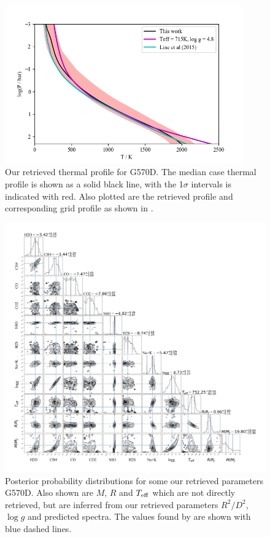 \documentclass[useAMS,usenatbib]{mn2e}
\begin{document}
\begin{figure}
\hspace{-0.8cm}\includegraphics[width=290pt]{G570D_profile_1sigma_GRID_NC.png}
\caption{Our retrieved thermal profile for G570D. The median case thermal profile is shown as a solid black line, with the 1$\sigma$ intervals is indicated with red.  Also plotted are the retrieved profile and corresponding grid profile as shown in \citet{line2015}.
\label{fig:g570TP}}
\end{figure}


\begin{figure}
\hspace{-0.8cm}
\includegraphics[width=550pt]{G570D_NC_post_corner.png}
\caption{Posterior probability distributions for some our retrieved parameters G570D. Also shown are $M$, $R$ and $T_{\rm eff}$ which are not directly retrieved, but are inferred from our retrieved parameters $R^2/D^2$, $\log g$ and predicted spectra. The values found by \citet{line2015} are shown with blue dashed lines. 
\label{fig:g570post}}
\end{figure}
\end{document}
